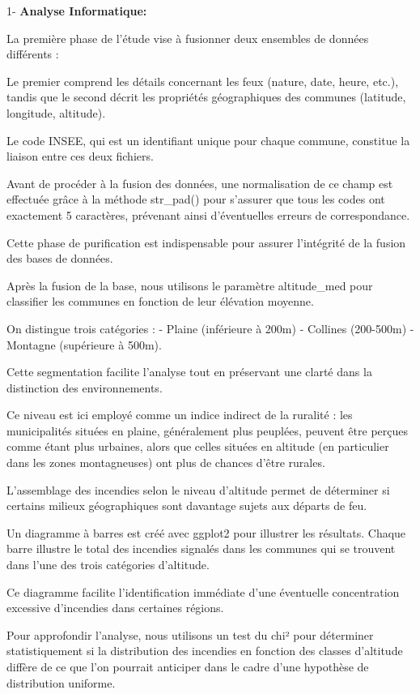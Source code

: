 \documentclass[
]{article}
\begin{document}
1- \textbf{Analyse Informatique:}

La première phase de l'étude vise à fusionner deux ensembles de données
différents :

Le premier comprend les détails concernant les feux (nature, date,
heure, etc.), tandis que le second décrit les propriétés géographiques
des communes (latitude, longitude, altitude).

Le code INSEE, qui est un identifiant unique pour chaque commune,
constitue la liaison entre ces deux fichiers.

Avant de procéder à la fusion des données, une normalisation de ce champ
est effectuée grâce à la méthode str\_pad() pour s'assurer que tous les
codes ont exactement 5 caractères, prévenant ainsi d'éventuelles erreurs
de correspondance.

Cette phase de purification est indispensable pour assurer l'intégrité
de la fusion des bases de données.

Après la fusion de la base, nous utilisons le paramètre altitude\_med
pour classifier les communes en fonction de leur élévation moyenne.

On distingue trois catégories : - Plaine (inférieure à 200m) - Collines
(200-500m) - Montagne (supérieure à 500m).

Cette segmentation facilite l'analyse tout en préservant une clarté dans
la distinction des environnements.

Ce niveau est ici employé comme un indice indirect de la ruralité : les
municipalités situées en plaine, généralement plus peuplées, peuvent
être perçues comme étant plus urbaines, alors que celles situées en
altitude (en particulier dans les zones montagneuses) ont plus de
chances d'être rurales.

L'assemblage des incendies selon le niveau d'altitude permet de
déterminer si certains milieux géographiques sont davantage sujets aux
départs de feu.

Un diagramme à barres est créé avec ggplot2 pour illustrer les
résultats. Chaque barre illustre le total des incendies signalés dans
les communes qui se trouvent dans l'une des trois catégories d'altitude.

Ce diagramme facilite l'identification immédiate d'une éventuelle
concentration excessive d'incendies dans certaines régions.

Pour approfondir l'analyse, nous utilisons un test du chi² pour
déterminer statistiquement si la distribution des incendies en fonction
des classes d'altitude diffère de ce que l'on pourrait anticiper dans le
cadre d'une hypothèse de distribution uniforme.
\end{document}
